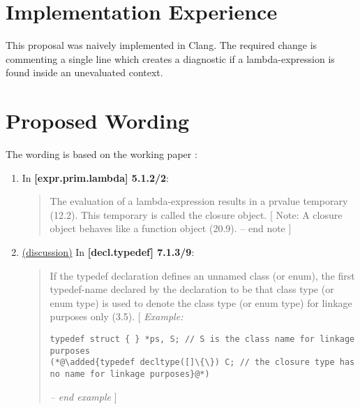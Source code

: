 \documentclass{wg21}
\begin{document}
\section{Implementation Experience}
This proposal was naively implemented in Clang. The required change is commenting
a single line which creates a diagnostic if a lambda-expression is found inside an
unevaluated context.


\section{Proposed Wording}
The wording is based on the working paper \cite{N4606}:

\begin{enumerate}
  \item \label{wording.remove}
    In \textbf{[expr.prim.lambda] 5.1.2/2}:
    \begin{quote}
      The evaluation of a lambda-expression results in a prvalue temporary
      (12.2). This temporary is called the closure object.  [ Note: A closure object behaves like
      a function object (20.9). -- end note ]
    \end{quote}

  \item \label{wording.non-template} \hyperref[discussion.non-template]{(discussion)}
    In \textbf{[decl.typedef] 7.1.3/9}:
    \begin{quote}
      If the typedef declaration defines an unnamed class (or enum), the first
      typedef-name declared by the declaration to be that class type (or enum type)
      is used to denote the class type (or enum type) for linkage purposes only (3.5).
      [ \textit{Example:}
\begin{lstlisting}[style=base]
typedef struct { } *ps, S; // S is the class name for linkage purposes
(*@\added{typedef decltype([]\{\}) C; // the closure type has no name for linkage purposes}@*)
\end{lstlisting}
      \textit{-- end example} ]
    \end{quote}


\end{enumerate}
\end{document}
